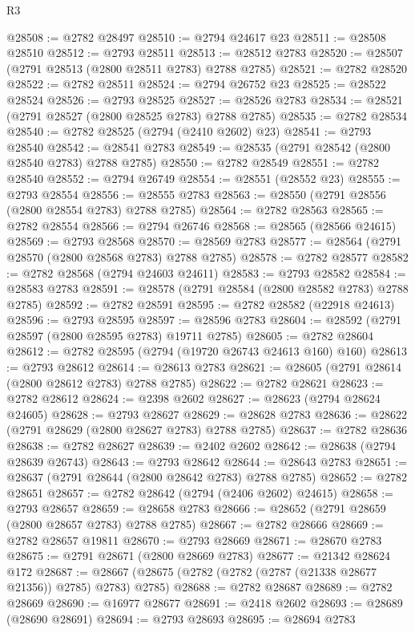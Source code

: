 \begin{lexlean}{R3}
\begin{coremodule}
@28508 := @2782 @28497
@28510 := @2794 @24617 @23
@28511 := @28508 @28510
@28512 := @2793 @28511
@28513 := @28512 @2783
@28520 := @28507 (@2791 @28513 (@2800 @28511 @2783) @2788 @2785)
@28521 := @2782 @28520
@28522 := @2782 @28511
@28524 := @2794 @26752 @23
@28525 := @28522 @28524
@28526 := @2793 @28525
@28527 := @28526 @2783
@28534 := @28521 (@2791 @28527 (@2800 @28525 @2783) @2788 @2785)
@28535 := @2782 @28534
@28540 := @2782 @28525 (@2794 (@2410 @2602) @23)
@28541 := @2793 @28540
@28542 := @28541 @2783
@28549 := @28535 (@2791 @28542 (@2800 @28540 @2783) @2788 @2785)
@28550 := @2782 @28549
@28551 := @2782 @28540
@28552 := @2794 @26749
@28554 := @28551 (@28552 @23)
@28555 := @2793 @28554
@28556 := @28555 @2783
@28563 := @28550 (@2791 @28556 (@2800 @28554 @2783) @2788 @2785)
@28564 := @2782 @28563
@28565 := @2782 @28554
@28566 := @2794 @26746
@28568 := @28565 (@28566 @24615)
@28569 := @2793 @28568
@28570 := @28569 @2783
@28577 := @28564 (@2791 @28570 (@2800 @28568 @2783) @2788 @2785)
@28578 := @2782 @28577
@28582 := @2782 @28568 (@2794 @24603 @24611)
@28583 := @2793 @28582
@28584 := @28583 @2783
@28591 := @28578 (@2791 @28584 (@2800 @28582 @2783) @2788 @2785)
@28592 := @2782 @28591
@28595 := @2782 @28582 (@22918 @24613)
@28596 := @2793 @28595
@28597 := @28596 @2783
@28604 := @28592 (@2791 @28597 (@2800 @28595 @2783) @19711 @2785)
@28605 := @2782 @28604
@28612 := @2782 @28595 (@2794 (@19720 @26743 @24613 @160) @160)
@28613 := @2793 @28612
@28614 := @28613 @2783
@28621 := @28605 (@2791 @28614 (@2800 @28612 @2783) @2788 @2785)
@28622 := @2782 @28621
@28623 := @2782 @28612
@28624 := @2398 @2602
@28627 := @28623 (@2794 @28624 @24605)
@28628 := @2793 @28627
@28629 := @28628 @2783
@28636 := @28622 (@2791 @28629 (@2800 @28627 @2783) @2788 @2785)
@28637 := @2782 @28636
@28638 := @2782 @28627
@28639 := @2402 @2602
@28642 := @28638 (@2794 @28639 @26743)
@28643 := @2793 @28642
@28644 := @28643 @2783
@28651 := @28637 (@2791 @28644 (@2800 @28642 @2783) @2788 @2785)
@28652 := @2782 @28651
@28657 := @2782 @28642 (@2794 (@2406 @2602) @24615)
@28658 := @2793 @28657
@28659 := @28658 @2783
@28666 := @28652 (@2791 @28659 (@2800 @28657 @2783) @2788 @2785)
@28667 := @2782 @28666
@28669 := @2782 @28657 @19811
@28670 := @2793 @28669
@28671 := @28670 @2783
@28675 := @2791 @28671 (@2800 @28669 @2783)
@28677 := @21342 @28624 @172
@28687 := @28667 (@28675 (@2782 (@2782 (@2787 (@21338 @28677 @21356)) @2785) @2783) @2785)
@28688 := @2782 @28687
@28689 := @2782 @28669
@28690 := @16977 @28677
@28691 := @2418 @2602
@28693 := @28689 (@28690 @28691)
@28694 := @2793 @28693
@28695 := @28694 @2783

\end{coremodule}
\end{lexlean}
